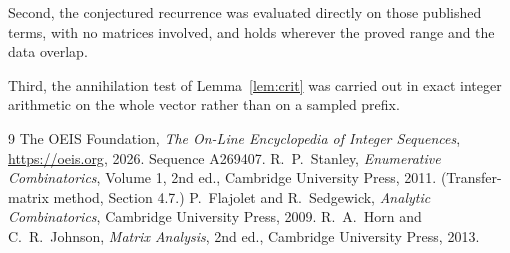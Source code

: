 \documentclass[11pt,a4paper]{article}
\theoremstyle{plain}
\theoremstyle{definition}
\begin{document}
Second, the conjectured recurrence was evaluated directly on those published terms, with no
matrices involved, and holds wherever the proved range and the data overlap.

Third, the annihilation test of Lemma~\ref{lem:crit} was carried out in exact integer
arithmetic on the whole vector rather than on a sampled prefix.

\begin{thebibliography}{9}
 The OEIS Foundation, \emph{The On-Line Encyclopedia of Integer
Sequences}, \url{https://oeis.org}, 2026. Sequence A269407.
 R.~P.~Stanley, \emph{Enumerative Combinatorics}, Volume 1, 2nd ed.,
Cambridge University Press, 2011. (Transfer-matrix method, Section 4.7.)
 P.~Flajolet and R.~Sedgewick, \emph{Analytic Combinatorics}, Cambridge
University Press, 2009.
 R.~A.~Horn and C.~R.~Johnson, \emph{Matrix Analysis}, 2nd ed., Cambridge
University Press, 2013.
\end{thebibliography}
\end{document}
